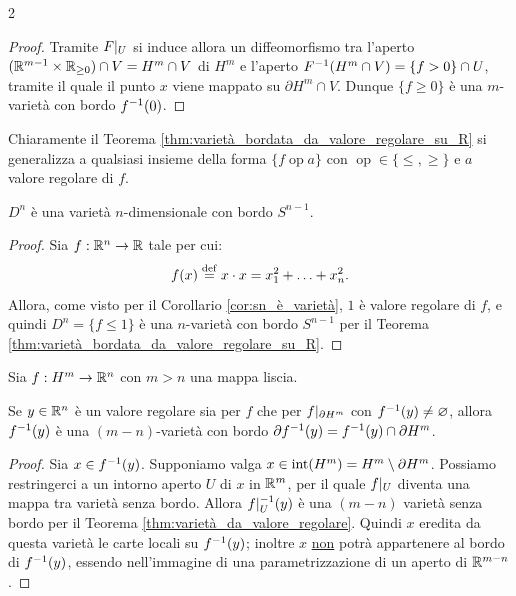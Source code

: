 \begin{multicols*}{2}
\begin{proof}
        Tramite $F\arrowvert_{U}$ si induce allora un diffeomorfismo tra l'aperto $(\mathbb{R}^{m-1} \times \mathbb{R}_{\geq 0}) \cap V = H^m \cap V$
        di $H^m$ e l'aperto $F^{-1}(H^m \cap V) = \{ f > 0 \} \cap U$, tramite il quale il punto $x$ viene
        mappato su $\partial H^m \cap V$. Dunque $\{ f \geq 0 \}$ è una $m$-varietà con bordo $f^{-1}(0)$.
    \end{proof}

    \begin{remark}
        Chiaramente il Teorema \ref{thm:varietà_bordata_da_valore_regolare_su_R} si generalizza
        a qualsiasi insieme della forma $\{ f \operatorname{op} a \}$ con $\operatorname{op} \in \{\leq, \geq\}$
        e $a$ valore regolare di $f$.
    \end{remark}

    \begin{corollary}
        $D^n$ è una varietà $n$-dimensionale con bordo $S^{n-1}$.
    \end{corollary}

    \begin{proof}
        Sia $f : \mathbb{R}^n \to \mathbb{R}$ tale per cui:
        \[
            f(x) \overset{\mathrm{def}}{=} x \cdot x = x_1^2 + \ldots + x_{n}^2.
        \]
        Allora, come visto per il Corollario \ref{cor:sn_è_varietà},
        $1$ è valore regolare di $f$, e quindi $D^n = \{ f \leq 1 \}$ è
        una $n$-varietà con bordo $S^{n-1}$ per il Teorema \ref{thm:varietà_bordata_da_valore_regolare_su_R}.
    \end{proof}

    \begin{lemma} \label{lem:varietà_bordata_da_valore_regolare_caso_particolare}
        Sia $f : H^m \to \mathbb{R}^n$ con $m > n$ una mappa liscia. \smallskip

        Se $y \in \mathbb{R}^n$ è un valore regolare
        sia per $f$ che per $f\arrowvert_{\partial H^m}$ con $f^{-1}(y) \neq \varnothing$, allora $f^{-1}(y)$ è una $(m-n)$-varietà con bordo
        $\partial f^{-1}(y) = f^{-1}(y) \cap \partial H^m$.
    \end{lemma}

    \begin{proof}
        Sia $x \in f^{-1}(y)$. Supponiamo valga $x \in \operatorname{int}(H^m) = H^m \setminus \partial H^m$. Possiamo
        restringerci a un intorno aperto $U$ di $x$ in $\mathbb{R}^m$, per il quale $f\arrowvert_{U}$ diventa una mappa tra
        varietà senza bordo. Allora $f\arrowvert_{U}^{-1}(y)$ è una $(m-n)$ varietà senza bordo per il
        Teorema \ref{thm:varietà_da_valore_regolare}. Quindi $x$ eredita da questa varietà le carte locali su $f^{-1}(y)$;
        inoltre $x$ \underline{non} potrà appartenere al bordo di $f^{-1}(y)$, essendo nell'immagine di una parametrizzazione
        di un aperto di $\mathbb{R}^{m-n}$. \smallskip


\end{proof}
\end{multicols*}
